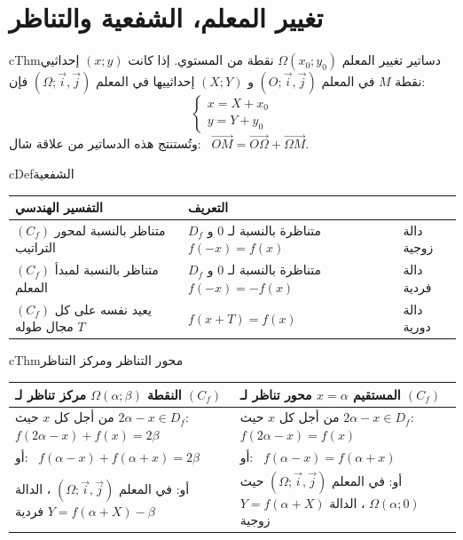 \documentclass[12pt,a4paper]{article}
\newenvironment{BOX}[2]{\begin{otherlanguage}{english}\begin{arbox}{#1}{#2}}{\end{arbox}\end{otherlanguage}}
\newenvironment{tarif}[1][تعريف]{\begin{BOX}{cDef}{#1}}{\end{BOX}}
\newenvironment{khassia}[1][خاصية]{\begin{BOX}{cThm}{#1}}{\end{BOX}}
\begin{document}
\section{تغيير المعلم، الشفعية والتناظر}
\begin{khassia}[دساتير تغيير المعلم]
$\Omega(x_0;y_0)$ نقطة من المستوي. إذا كانت $(x;y)$ إحداثيي نقطة $M$ في المعلم $\left(O;\vec i,\vec j\right)$ و $(X;Y)$ إحداثييها في المعلم $\left(\Omega;\vec i,\vec j\right)$ فإن:
\[\begin{cases}x=X+x_0\\ y=Y+y_0\end{cases}\]
وتُستنتج هذه الدساتير من علاقة شال: \ $\overrightarrow{OM}=\overrightarrow{O\Omega}+\overrightarrow{\Omega M}$.
\end{khassia}
\begin{tarif}[الشفعية]
\begin{center}
\renewcommand{\arraystretch}{1.5}
\begin{tabular}{|>{\centering\arraybackslash}m{5.8cm}|>{\centering\arraybackslash}m{6.8cm}|>{\centering\arraybackslash}m{2.6cm}|}\hline
 \textbf{التفسير الهندسي} & \textbf{التعريف} & \\\hline
$(C_f)$ متناظر بالنسبة لمحور التراتيب & $D_f$ متناظرة بالنسبة لـ $0$ و $f(-x)=f(x)$ & دالة زوجية\\\hline
$(C_f)$ متناظر بالنسبة لمبدأ المعلم & $D_f$ متناظرة بالنسبة لـ $0$ و $f(-x)=-f(x)$ & دالة فردية\\\hline
$(C_f)$ يعيد نفسه على كل مجال طوله $T$ & $f(x+T)=f(x)$ & دالة دورية\\\hline
\end{tabular}
\end{center}
\end{tarif}
\begin{khassia}[محور التناظر ومركز التناظر]
\begin{center}
\renewcommand{\arraystretch}{1.5}
\begin{tabular}{|>{\centering\arraybackslash}m{7.5cm}|>{\centering\arraybackslash}m{7.5cm}|}\hline
\textbf{النقطة $\Omega(\alpha;\beta)$ مركز تناظر لـ $(C_f)$} & \textbf{المستقيم $x=\alpha$ محور تناظر لـ $(C_f)$}\\\hline
من أجل كل $x$ حيث $2\alpha-x\in D_f$: \newline $f(2\alpha-x)+f(x)=2\beta$ & من أجل كل $x$ حيث $2\alpha-x\in D_f$: \newline $f(2\alpha-x)=f(x)$\\\hline
أو: \ $f(\alpha-x)+f(\alpha+x)=2\beta$ & أو: \ $f(\alpha-x)=f(\alpha+x)$\\\hline
أو: في المعلم $(\Omega;\vec i,\vec j)$ ، الدالة $Y=f(\alpha+X)-\beta$ فردية & أو: في المعلم $(\Omega;\vec i,\vec j)$ حيث $\Omega(\alpha;0)$ ، الدالة $Y=f(\alpha+X)$ زوجية\\\hline
\end{tabular}
\end{center}
\end{khassia}
\end{document}
